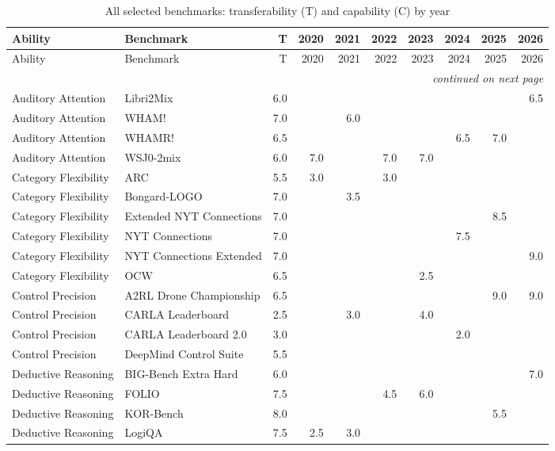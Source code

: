 \begin{longtable}{lp{4.6cm}rrrrrrrr}
\caption{All selected benchmarks: transferability (T) and capability (C) by year}\label{tab:benchmarkscores} \\ \toprule
Ability & Benchmark & T & 2020 & 2021 & 2022 & 2023 & 2024 & 2025 & 2026 \\ \midrule \endfirsthead
\toprule Ability & Benchmark & T & 2020 & 2021 & 2022 & 2023 & 2024 & 2025 & 2026 \\ \midrule \endhead
\midrule \multicolumn{10}{r}{\footnotesize\textit{continued on next page}} \\ \endfoot
\bottomrule \endlastfoot
Auditory Attention & Libri2Mix & 6.0 &  &  &  &  &  &  & 6.5 \\
Auditory Attention & WHAM! & 7.0 &  & 6.0 &  &  &  &  &  \\
Auditory Attention & WHAMR! & 6.5 &  &  &  &  & 6.5 & 7.0 &  \\
Auditory Attention & WSJ0-2mix & 6.0 & 7.0 &  & 7.0 & 7.0 &  &  &  \\
Category Flexibility & ARC & 5.5 & 3.0 &  & 3.0 &  &  &  &  \\
Category Flexibility & Bongard-LOGO & 7.0 &  & 3.5 &  &  &  &  &  \\
Category Flexibility & Extended NYT Connections & 7.0 &  &  &  &  &  & 8.5 &  \\
Category Flexibility & NYT Connections & 7.0 &  &  &  &  & 7.5 &  &  \\
Category Flexibility & NYT Connections Extended & 7.0 &  &  &  &  &  &  & 9.0 \\
Category Flexibility & OCW & 6.5 &  &  &  & 2.5 &  &  &  \\
Control Precision & A2RL Drone Championship & 6.5 &  &  &  &  &  & 9.0 & 9.0 \\
Control Precision & CARLA Leaderboard & 2.5 &  & 3.0 &  & 4.0 &  &  &  \\
Control Precision & CARLA Leaderboard 2.0 & 3.0 &  &  &  &  & 2.0 &  &  \\
Control Precision & DeepMind Control Suite & 5.5 &  &  &  &  &  &  &  \\
Deductive Reasoning & BIG-Bench Extra Hard & 6.0 &  &  &  &  &  &  & 7.0 \\
Deductive Reasoning & FOLIO & 7.5 &  &  & 4.5 & 6.0 &  &  &  \\
Deductive Reasoning & KOR-Bench & 8.0 &  &  &  &  &  & 5.5 &  \\
Deductive Reasoning & LogiQA & 7.5 & 2.5 & 3.0 &  &  &  &  &  \\

\end{longtable}
